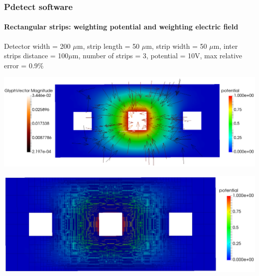 \documentclass[14pt]{beamer}
\begin{document}
\begin{frame}
  \frametitle{Pdetect software}
  \framesubtitle{Rectangular strips: weighting potential and weighting electric field}

  \fontsize{10pt}{7.2}\selectfont


  Detector width = 200 $\mu$m, strip length = 50 $\mu$m, strip width = 50 $\mu$m,
  inter strips distance = 100$\mu$m, number of strips = 3, potential = 10V,
  max relative error = 0.9$\%$

  \begin{center}
  \includegraphics[scale=0.18]{images/rect_rect_pot_3_weight.png}
  \end{center}

\vspace{-2em}

  \begin{center}
  \hspace{4em} \includegraphics[scale=0.15]{images/rect_rect_pot_3_weight_grid.png}
  \end{center}

\end{frame}
\end{document}

